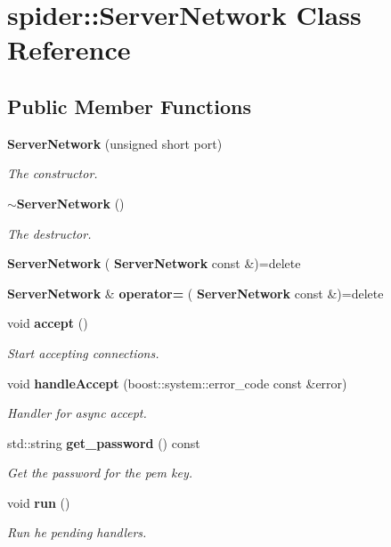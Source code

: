 \section{spider\+:\+:Server\+Network Class Reference}
\label{classspider_1_1_server_network}
\subsection*{Public Member Functions}
\begin{DoxyCompactItemize}
\item 
\textbf{ Server\+Network} (unsigned short port)
\begin{DoxyCompactList}\small\item\em The constructor. \end{DoxyCompactList}\item 
\mbox{\label{classspider_1_1_server_network_adccf2ce56686855a9566af94e2f39976}} 
\textbf{ $\sim$\+Server\+Network} ()
\begin{DoxyCompactList}\small\item\em The destructor. \end{DoxyCompactList}\item 
\mbox{\label{classspider_1_1_server_network_af4559a50f6d6886a51444674a3888e86}} 
{\bfseries Server\+Network} (\textbf{ Server\+Network} const \&)=delete
\item 
\mbox{\label{classspider_1_1_server_network_ab7276feccc0acf76b7bc0df9387a118f}} 
\textbf{ Server\+Network} \& {\bfseries operator=} (\textbf{ Server\+Network} const \&)=delete
\item 
\mbox{\label{classspider_1_1_server_network_aa1b10134b8d512368c6b607c8e3e7481}} 
void \textbf{ accept} ()
\begin{DoxyCompactList}\small\item\em Start accepting connections. \end{DoxyCompactList}\item 
void \textbf{ handle\+Accept} (boost\+::system\+::error\+\_\+code const \&error)
\begin{DoxyCompactList}\small\item\em Handler for async accept. \end{DoxyCompactList}\item 
std\+::string \textbf{ get\+\_\+password} () const
\begin{DoxyCompactList}\small\item\em Get the password for the pem key. \end{DoxyCompactList}\item 
\mbox{\label{classspider_1_1_server_network_acccd166e6a5ce90636a491a60cc97abf}} 
void \textbf{ run} ()
\begin{DoxyCompactList}\small\item\em Run he pending handlers. \end{DoxyCompactList}\end{DoxyCompactItemize}



